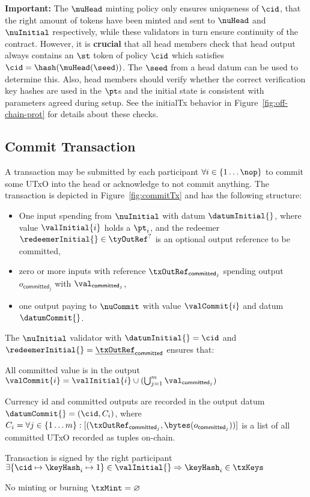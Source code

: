 \noindent \textbf{Important:} The $\muHead$ minting policy only ensures
uniqueness of $\cid$, that the right amount of tokens have been minted and sent
to $\nuHead$ and $\nuInitial$ respectively, while these validators in turn
ensure continuity of the contract. However, it is \textbf{crucial} that all head
members check that head output always contains an $\st$ token of policy $\cid$
which satisfies $\cid = \hash(\muHead(\seed))$. The $\seed$ from a head datum
can be used to determine this. Also, head members should verify whether the
correct verification key hashes are used in the $\pt$s and the initial state is
consistent with parameters agreed during setup. See the initialTx behavior in
Figure~\ref{fig:off-chain-prot} for details about these checks.\\

\subsection{Commit Transaction}\label{sec:commit-tx}

A \mtxCom{} transaction may be submitted by each participant
$\forall i \in \{1 \dots \nop\}$ to commit some UTxO into the head or
acknowledge to not commit anything. The transaction is depicted in
Figure~\ref{fig:commitTx} and has the following structure:
\begin{itemize}
	\item One input spending from $\nuInitial$ with datum $\datumInitial{}$,
	      where value $\valInitial{i}$ holds a $\pt_i$, and the redeemer
	      $\redeemerInitial{} \in \tyOutRef^{?}$ is an optional output
	      reference to be committed,
	\item zero or more inputs with reference $\txOutRef_{\mathsf{committed}_{j}}$
	      spending output $o_{\mathsf{committed}_{j}}$ with
	      $\val_{\mathsf{committed}_{j}}$,
	\item one output paying to $\nuCommit$ with value $\valCommit{i}$ and datum $\datumCommit{}$.
\end{itemize}

\noindent The $\nuInitial$ validator with $\datumInitial{} = \cid$ and
$\redeemerInitial{} = \underline{\txOutRef}_{\mathsf{committed}}$ ensures that:
\begin{menumerate}
	\item All committed value is in the output
	$\valCommit{i} = \valInitial{i} \cup (\bigcup_{j=1}^{m} \val_{\mathsf{committed}_{j}})$
	\item Currency id and committed outputs are recorded in the output datum
	$\datumCommit{} = (\cid, C_{i})$, where
	$C_{i} = \forall j \in \{1 \dots m\} : [(\txOutRef_{\mathsf{committed}_{j}},\bytes(o_{\mathsf{committed}_{j}}))]$
	is a list of all committed UTxO recorded as tuples on-chain.
	\item Transaction is signed by the right participant
	$\exists \{\cid \mapsto \keyHash_{i} \mapsto 1\} \in \valInitial{} \Rightarrow \keyHash_{i} \in \txKeys$
	\item No minting or burning $\txMint = \varnothing$
\end{menumerate}

